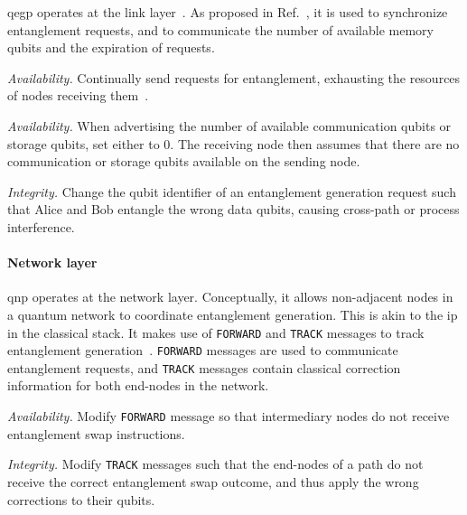 \acrshort{qegp} operates at the link layer~\cite{dahlberg_2019_egp}. As proposed in
Ref.~\cite{dahlberg_2019_egp}, it is used to synchronize entanglement requests, and to communicate
the number of available memory qubits and the expiration of requests.

\begin{example}
\textit{Availability.}
Continually send requests for entanglement, exhausting the resources of nodes receiving
them~\cite{kozlowski_wehner_2019}.
\end{example}

\begin{example}
\textit{Availability.}
When advertising the number of available communication qubits or storage qubits, set either to 0.
The receiving node then assumes that there are no communication or storage qubits available on the
sending node.
\end{example}

\begin{example}
\textit{Integrity.}
Change the qubit identifier of an entanglement generation request such that Alice and Bob entangle
the wrong data qubits, causing cross-path or process interference.
\end{example}

\paragraph{Network layer}

\acrshort{qnp} operates at the network layer. Conceptually, it allows non-adjacent nodes in a
quantum network to coordinate entanglement generation. This is akin to the \acrfull{ip} in the
classical stack. It makes use of \texttt{FORWARD} and \texttt{TRACK} messages to track entanglement
generation~\cite[Figure 6]{kozlowski_2020_qnp}. \texttt{FORWARD} messages are used to communicate
entanglement requests, and \texttt{TRACK} messages contain classical correction information for both
end-nodes in the network.

\begin{example}
\textit{Availability.}
Modify \texttt{FORWARD} message so that intermediary nodes do not receive entanglement swap
instructions.
\end{example}

\begin{example}
\textit{Integrity.}
Modify \texttt{TRACK} messages such that the end-nodes of a path do not receive the correct
entanglement swap outcome, and thus apply the wrong corrections to their qubits.
\end{example}

